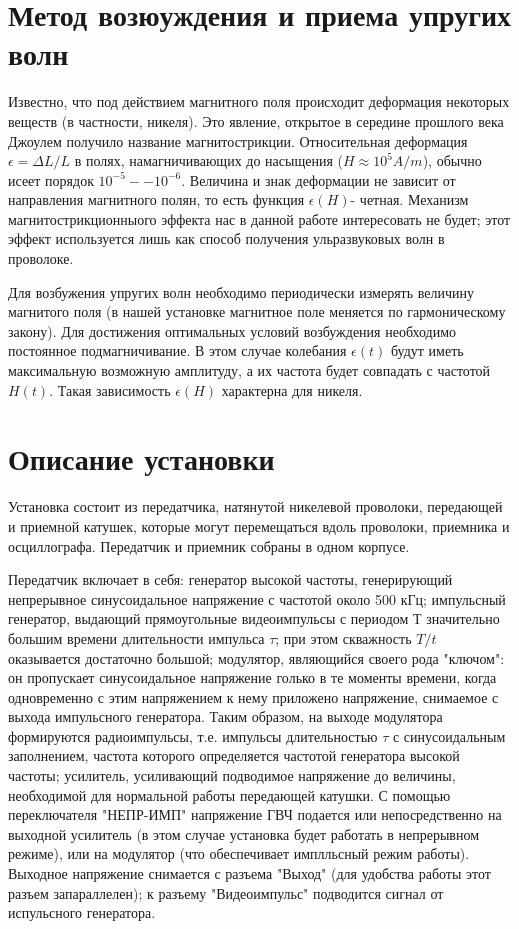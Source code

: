 \section{Метод возюуждения и приема упругих волн}

Известно, что под действием магнитного поля происходит деформация некоторых веществ (в частности, никеля). Это явление, открытое в середине прошлого века Джоулем получило название магнитострикции. Относительная деформация $\epsilon=\Delta L/L$ в полях, намагничивающих до насыщения ($H\approx10^5 A/m$), обычно исеет порядок $10^{-5}--10^{-6}$. Величина и знак деформации не зависит от направления магнитного полян, то есть функция $\epsilon(H)$- четная. Механизм магнитострикционныого эффекта нас в данной работе интересовать не будет; этот эффект используется лишь как способ получения ульразвуковых волн в проволоке.

Для возбужения упругих волн необходимо периодически измерять величину магнитого поля (в нашей установке магнитное поле меняется по гармоническому закону). Для достижения оптимальных условий возбуждения необходимо постоянное подмагничивание. В этом случае колебания $\epsilon(t)$ будут иметь максимальную возможную амплитуду, а их частота будет совпадать с частотой $H(t)$. Такая зависимость $\epsilon(H)$ характерна для никеля.

\section{Описание установки}

Установка состоит из передатчика, натянутой никелевой проволоки, передающей и приемной катушек, которые могут перемещаться вдоль проволоки, приемника и осциллографа. Передатчик и приемник собраны в одном корпусе.

Передатчик включает в себя: генератор высокой частоты, генерирующий непрерывное синусоидальное напряжение с частотой около 500 кГц; импульсный генератор, выдающий прямоугольные видеоимпульсы с периодом Т значительно большим времени длительности импульса $\tau$; при этом скважность $T/t$ оказывается достаточно большой; модулятор, являющийся своего рода "ключом": он пропускает синусоидальное напряжение голько в те моменты времени, когда одновременно с этим напряжением к нему приложено напряжение, снимаемое с выхода импульсного генератора. Таким образом, на выходе модулятора формируются радиоимпульсы, т.е. импульсы длительностью $\tau$ с синусоидальным заполнением, частота которого определяется частотой генератора высокой частоты; усилитель, усиливающий подводимое напряжение до величины, необходимой для нормальной работы передающей катушки.
С помощью переключателя "НЕПР-ИМП" напряжение ГВЧ подается или непосредственно на выходной усилитель (в этом случае установка будет работать в непрерывном режиме), или на модулятор (что обеспечивает имплльсный режим работы). Выходное напряжение снимается с разъема "Выход" (для удобства работы этот разъем запараллелен); к разъему "Видеоимпульс" подводится сигнал от испульсного генератора.

